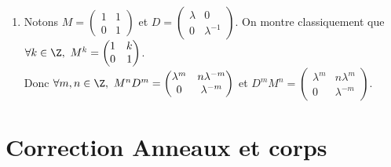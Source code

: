 \documentclass[8pt]{book}
\begin{document}
\begin{enumerate}[leftmargin=*]
		Si $\cos(\theta)\in \{-1,0,1\}$ alors $\lambda^4=1$ et si $\cos(\theta)\in \displaystyle\left\{-\frac{1}{2},\frac{1}{2}\right\}$ alors $\lambda^6=1$.
		\item Notons $M=\begin{pmatrix}1&1\\0&1\end{pmatrix}$ et $D=\begin{pmatrix}\lambda&0\\0&\lambda^{-1}\end{pmatrix}$. On montre classiquement que $\forall k\in \Z,\ M^k=\begin{pmatrix}1&k\\0&1\end{pmatrix}$.\\
		Donc $\forall m,n\in \Z,\ M^nD^m=\begin{pmatrix}\lambda^m&n\lambda^{-m}\\0&\lambda^{-m}\end{pmatrix}$ et $D^mM^n=\begin{pmatrix}\lambda^m&n\lambda^m\\0&\lambda^{-m}\end{pmatrix}$.
	\end{enumerate} 
	\newpage
\section{Correction Anneaux et corps}
\end{document}
